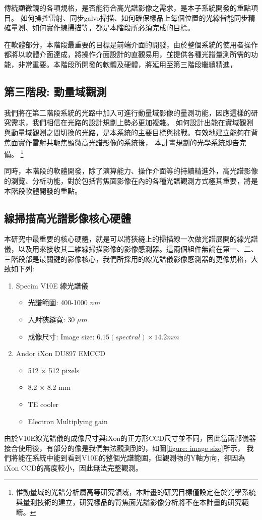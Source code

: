 \documentclass[12pt]{article}
\begin{document}
傳統顯微鏡的各項規格，是否能符合高光譜影像之需求，是本子系統開發的重點項目。
如何操控雷射、同步galvo掃描、如何確保樣品上每個位置的光線皆能同步精確量測、如何實作線掃描等，都是本階段所必須完成的目標。

在軟體部分，本階段最重要的目標是前端介面的開發，由於整個系統的使用者操作都將以軟體介面達成，將操作介面設計的直觀易用，並提供各種光譜量測所需的功能，非常重要。本階段所開發的軟體及硬體，將延用至第三階段繼續精進，

\subsection{第三階段: 動量域觀測} \label{momentum}
我們將在第二階段系統的光路中加入可進行動量域影像的量測功能，因應這樣的研究需求，我們相信在光路的設計規劃上勢必更加複雜。
如何設計出能在實域觀測與動量域觀測之間切換的光路，是本系統的主要目標與挑戰。有效地建立能夠在背焦面實作雷射共軛焦顯微高光譜影像的系統後，
本計畫規劃的光學系統即告完備。
\footnote{惟動量域的光譜分析屬高等研究領域，本計畫的研究目標僅設定在於光學系統與量測技術的建立，研究樣品的背焦面光譜影像分析將不在本計畫的研究範疇。}

同時，本階段的軟體開發，除了演算能力、操作介面等的持續精進外，高光譜影像的瀏覽、分析功能，對於包括背焦面影像在內的各種光譜觀測方式極其重要，將是本階段軟體開發的重點。

\subsection{線掃描高光譜影像核心硬體}
本研究中最重要的核心硬體，就是可以將狹縫上的掃描線一次做光譜展開的線光譜儀，以及用來接收其二維線掃描影像的影像感測器。這兩個組件無論在第一、二、三階段部是最關鍵的影像核心，我們所採用的線光譜儀影像感測器的更像規格，大致如下列:
\begin{enumerate}
    \item Specim V10E 線光譜儀
          \begin{itemize}
              \item 光譜範圍: 400-1000 $nm$
              \item 入射狹縫寬: 30 $\mu m$
              \item 成像尺寸: Image size: $6.15(spectral) \times 14.2 mm$
          \end{itemize}
    \item Andor iXon DU897 EMCCD
          \begin{itemize}
              \item 512 $\times$ 512 pixels
              \item 8.2 $\times$ 8.2 mm
              \item TE cooler
              \item Electron Multiplying gain
          \end{itemize}
\end{enumerate}
由於V10E線光譜儀的成像尺寸與iXon的正方形CCD尺寸並不同，因此當兩部儀器接合使用後，有部分的像是我們無法觀測到的，如圖\ref{figure: image size}所示，
我們將能在系統中能到看到V10E的整個光譜範圍，但觀測物的Y軸方向，卻因為iXon CCD的高度較小，因此無法完整觀測。
\end{document}
